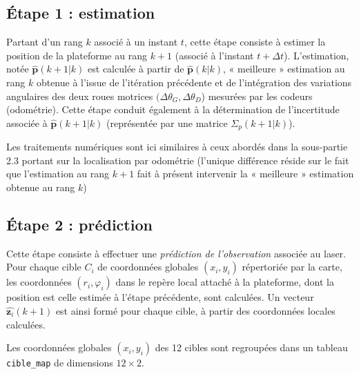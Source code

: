 \subsection*{Étape 1 : estimation}
Partant d’un rang $k$ associé à un instant $t$, cette étape consiste à estimer la position de la plateforme
au rang $k + 1$ (associé à l’instant $t + \Delta t$). L’estimation, notée $\hat{\bm{p}}(k + 1 | k)$ est calculée à partir de $\hat{\bm{p}}(k | k)$,
« meilleure » estimation au rang $k$ obtenue à l’issue de l’itération précédente et de l’intégration des
variations angulaires des deux roues motrices $(\Delta \theta_G, \Delta \theta_D$) mesurées par les codeurs (odométrie). Cette
étape conduit également à la détermination de l’incertitude associée à $\hat{\bm{p}}(k + 1 | k)$ (représentée par une
matrice $\Sigma_p(k + 1 | k)$).

Les traitements numériques sont ici similaires à ceux abordés dans la sous-partie 2.3 portant sur la
localisation par odométrie (l’unique différence réside sur le fait que l’estimation au rang $k + 1$ fait à
présent intervenir la « meilleure » estimation obtenue au rang $k$)


\subsection*{Étape 2 : prédiction}
Cette étape consiste à effectuer une \textit{prédiction de l’observation} associée au laser. Pour chaque cible
$C_i$ de coordonnées globales $(x_i, y_i)$ répertoriée par la carte, les coordonnées $(r_i, \varphi_i)$ dans le repère local
attaché à la plateforme, dont la position est celle estimée à l’étape précédente, sont calculées. Un
vecteur $\hat{\bm{z}_i}(k + 1)$ est ainsi formé pour chaque cible, à partir des coordonnées locales calculées.

Les coordonnées globales $(x_i, y_i)$ des 12 cibles sont regroupées dans un tableau \lstinline{cible_map} de dimensions $12 \times  2$.


